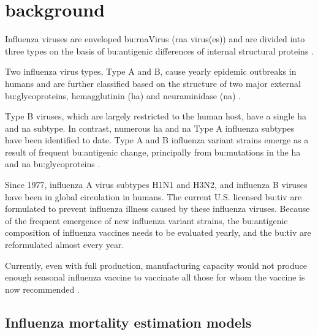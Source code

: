 

\makeglossaries





\tableofcontents
\printglossary[type=bus]
\printglossary[type=dm]
\printglossary[type=\acronymtype]


\section{background}

Influenza viruses are enveloped \gls{bu:rnaVirus} (\acrshort{rna} virus(es)) and
are divided into three types on the basis of \gls{bu:antigen}ic differences of internal
structural proteins \citep{fdaGuidanceIndustryClinical2007}.

Two influenza virus types, Type A and B, cause yearly epidemic outbreaks in humans
and are further classified based on the structure of two major external
\gls{bu:glycoprotein}s, hemagglutinin (\acrshort{ha}) and neuraminidase (\acrshort{na})
\citep{fdaGuidanceIndustryClinical2007}.

Type B viruses, which are largely restricted to the human host, have a single
\acrshort{ha} and \acrshort{na} subtype.  In contrast, numerous \acrshort{ha}
and \acrshort{na} Type A influenza subtypes have been identified to date.  Type
A and B influenza variant strains emerge as a result of frequent
\gls{bu:antigen}ic change, principally from \gls{bu:mutation}s in the \acrshort{ha}
and \acrshort{na} \gls{bu:glycoprotein}s \citep{fdaGuidanceIndustryClinical2007}.

Since 1977, influenza A virus subtypes H1N1 and H3N2, and influenza B viruses
have been in global circulation in humans. The current U.S. licensed
\gls{bu:tiv} are formulated to prevent influenza illness
caused by these influenza viruses.  Because of the frequent emergence of new
influenza variant strains, the \gls{bu:antigen}ic composition of influenza vaccines
needs to be evaluated yearly, and the \gls{bu:tiv} are reformulated almost every
year.

Currently, even with full production, manufacturing capacity would not produce
enough seasonal influenza vaccine to vaccinate all those for whom the vaccine
is now recommended \citep{fdaGuidanceIndustryClinical2007}.

\subsection{Influenza mortality estimation models}

